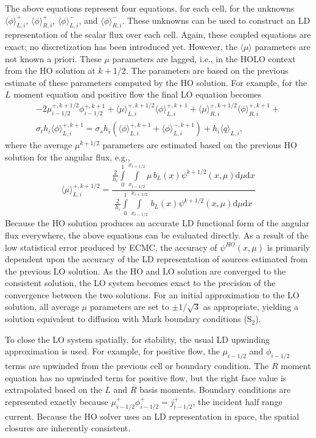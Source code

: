 \documentclass{mc2013}
\renewcommand{\d}{\mathrm{d}}
\newcommand{\mom}[1]{\langle #1 \rangle}
\newcommand{\xl}{{x_{i-1/2}}}
\newcommand{\xr}{{x_{i+1/2}}}
\begin{document}
The above equations represent four equations, for each cell, for the unknowns $\mom{\phi}_{L,i}^+$,
$\mom{\phi}_{R,i}^+$, $\mom{\phi}_{L,i}^-$, and $\mom{\phi}_{R,i}^-$.  These unknowns can
be used to construct an LD representation of the scalar flux over each cell.
Again, these coupled equations are exact; no discretization has been introduced
yet.  However, the $\mom{\mu}$ parameters are not known a priori.  These $\mu$
parameters are lagged, i.e., in the HOLO context from the HO solution at $k+1/2$.  The parameters are based on the previous estimate of these parameters computed
by the HO solution.  For example, for the $L$ moment equation and positive flow the
final LO equation becomes
\begin{multline}
  -2{\mu}_{i-1/2}^{+,k+1/2} \phi_{i-1/2}^{+,k+1} + \mom {\mu}_{L,i}^{+,k+1/2}
  \mom{\phi}_{L,i}^{+,k+1}
  +  \mom\mu_{R,i}^{+,k+1/2}
  \mom{\phi}_{R,i}^{+,k+1} + \\  \sigma_t h_i \mom{\phi}_{L,i}^{+,k+1}  =  \sigma_s
  h_i \left( \mom{\phi}_{L,i}^{+,k+1} +
  \mom\phi_{L,i}^{-,k+1}\right) + h_i \mom{q}_{L,i},
\end{multline}
where the average $\mu^{k+1/2}$ parameters are estimated based on the previous HO solution
for the angular flux, e.g.,
\begin{equation}\displaystyle 
\mom{{\mu}}_{L,i}^{+,k+1/2} = \frac{\displaystyle 
  \frac{2}{h_i} \int\limits_0^1 \int\limits_\xl^\xr \mu \, b_L(x) \psi^{k+1/2}(x,\mu) \d \mu \d x } 
  {\displaystyle \frac{2}{h_i} \int\limits_0^1 \int\limits_\xl^\xr \, b_L(x)
\psi^{k+1/2}(x,\mu) \d \mu \d x } 
\end{equation}
Because the HO solution produces an accurate LD functional form of the angular flux
everywhere,
the above equations can be evaluated directly.  As a result of the low statistical error produced by ECMC, the accuracy of $\psi^{HO}(x,\mu)$
is primarily dependent upon the accuracy of the LD representation of sources estimated from the
previous LO solution.  As the HO and LO solution are converged to the consistent solution,
the LO system becomes exact to the precision of the convergence between the two solutions. 
For an initial approximation to the LO solution, all average $\mu$ parameters are
set to $\pm 1/\sqrt{3}$ as appropriate, yielding a solution equivalent to diffusion
with Mark boundary conditions (S$_2$).


To close the LO system spatially, for stability, the usual LD upwinding
approximation is used.  For example, for positive flow, the $\mu_{i-1/2}$ and $\phi_{i-1/2}$
terms are upwinded from the previous cell or boundary condition.  The $R$ moment equation has no upwinded term for positive flow, but
the right face value is extrapolated based on the $L$ and $R$ basis moments.
Boundary conditions are represented exactly because $\mu_{i-1/2}^+
\phi_{i-1/2}^+ = j_{i-1/2}^+$, the incident half range current.  Because the HO
solver uses an LD representation in space, the spatial closures are inherently
consistent.  
\end{document}
